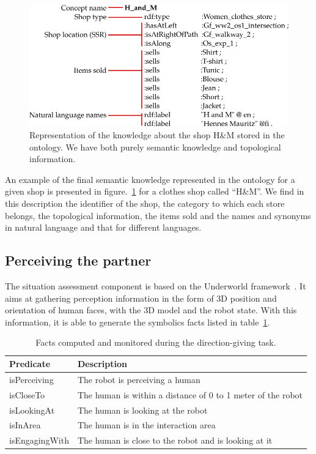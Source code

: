 \begin{figure}[ht!]
\centering
\includegraphics[scale=0.5]{figures/chapter8/zizzi.png}
\caption{\label{fig:chap8_zizzi} Representation of the knowledge about the shop H\&M stored in the ontology. We have both purely semantic knowledge and topological information. }
\end{figure}

An example of the final semantic knowledge represented in the ontology for a given shop is presented in figure.~\ref{fig:chap8_zizzi} for a clothes shop called ``H\&M''. We find in this description the identifier of the shop, the category to which each store belongs, the topological information, the items sold and the names and synonyms in natural language and that for different languages.

\subsection{Perceiving the partner}

The situation assessment component is based on the Underworld framework~\cite{lemaignan_2018_underworlds}. It aims at gathering perception information in the form of 3D position and orientation of human faces, with the 3D model and the robot state. With this information, it is able to generate the symbolics facts listed in table~\ref{tab:chap8_predicates}.

\begin{table}[ht!]
    \centering
    \begin{tabularx}{\textwidth}{|l|X|}
     \hline
    \textbf{Predicate} & \textbf{Description} \\
    \hline
    \hline
        isPerceiving & The robot is perceiving a human \\
        \hline
        isCloseTo & The human is within a distance of 0 to 1 meter of the robot \\
         \hline
        isLookingAt & The human is looking at the robot \\
        \hline
    \hline
        isInArea & The human is in the interaction area \\
        \hline
        isEngagingWith & The human is close to the robot and is looking at it \\
       \hline
    \end{tabularx}
    \caption{Facts computed and monitored during the direction-giving task.}
    \label{tab:chap8_predicates}
\end{table}

